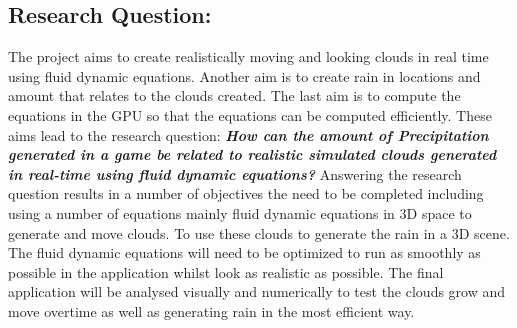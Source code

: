 \subsection{Research Question:}
The project aims to create realistically moving and looking clouds in real time using fluid dynamic equations. Another aim is to create rain in locations and amount that relates to the clouds created. The last aim is to compute the equations in the GPU so that the equations can be computed efficiently. These aims lead to the research question:
\textit{\textbf{How can the amount of Precipitation generated in a game be related to realistic simulated clouds generated in real-time using fluid dynamic equations?}}
Answering the research question results in a number of objectives the need to be completed including using a number of equations mainly fluid dynamic equations in 3D space to generate and move clouds. To use these clouds to generate the rain in a 3D scene. 
The fluid dynamic equations will need to be optimized to run as smoothly as possible in the application whilst look as realistic as possible. The final application will be analysed visually and numerically to test the clouds grow and move overtime as well as generating rain in the most efficient way.